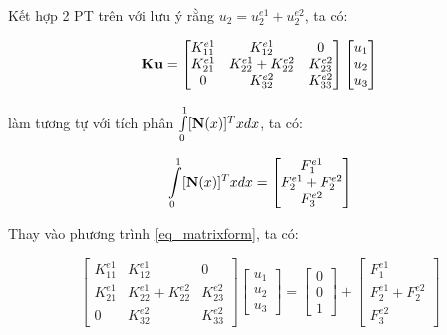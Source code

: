 Kết hợp 2 PT trên với lưu ý rằng $u_2 = u_2^{e1} + u_2^{e2}$, ta có:

\begin{equation}
    {\bf K}{\bf u} = \begin{bmatrix}
        K_{11}^{e1} & K_{12}^{e1} & 0\\
        K_{21}^{e1} & K_{22}^{e1}+K_{22}^{e2} & K_{23}^{e2} \\
        0 & K_{32}^{e2} & K_{33}^{e2}
    \end{bmatrix}\begin{bmatrix}
        u_1 \\ u_2 \\ u_3
    \end{bmatrix}
\end{equation}

làm tương tự với tích phân $ \int\limits_0^1 [{\bf N}(x)]^Tx dx$, ta có:

\begin{equation}
    \int\limits_0^1 [{\bf N}(x)]^Tx dx = \begin{bmatrix}
        F_1^{e1} \\ F_2^{e1}+F_2^{e2} \\ F_3^{e2}
    \end{bmatrix}
\end{equation}

Thay vào phương trình \cref{eq_matrixform}, ta có:

\begin{equation}
    \begin{bmatrix}
        K_{11}^{e1} & K_{12}^{e1} & 0\\
        K_{21}^{e1} & K_{22}^{e1}+K_{22}^{e2} & K_{23}^{e2} \\
        0 & K_{32}^{e2} & K_{33}^{e2}
    \end{bmatrix}\begin{bmatrix}
        u_1 \\ u_2 \\ u_3
    \end{bmatrix} = \begin{bmatrix}
        0 \\ 0 \\ 1
    \end{bmatrix} + \begin{bmatrix}
        F_1^{e1} \\ F_2^{e1}+F_2^{e2} \\ F_3^{e2}
    \end{bmatrix}
\end{equation}


